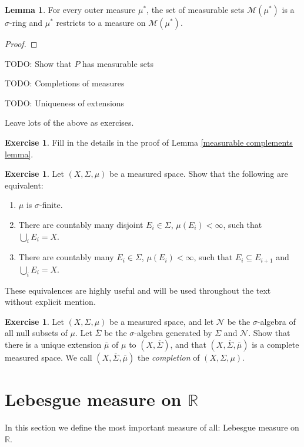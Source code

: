 \documentclass[12pt]{book}
\newcommand{\RR}{\mathbb{R}}
\newcommand{\dfn}[1]{\emph{#1}\index{#1}}
\theoremstyle{definition}
\newtheorem{lemma}[theorem]{Lemma}
\newtheorem{exercise}[theorem]{Exercise}
\begin{document}
\begin{lemma}
For every outer measure $\mu^*$, the set of measurable sets $\mathcal M(\mu^*)$ is a $\sigma$-ring and $\mu^*$ restricts to a measure on $\mathcal M(\mu^*)$.
\end{lemma}
\begin{proof}

\end{proof}



TODO: Show that $P$ has measurable sets

TODO: Completions of measures

TODO: Uniqueness of extensions

Leave lots of the above as exercises.

\begin{exercise}
\label{measurable complements}
Fill in the details in the proof of Lemma \ref{measurable complements lemma}.
\end{exercise}

\begin{exercise}
Let $(X, \Sigma, \mu)$ be a measured space. Show that the following are equivalent:
\begin{enumerate}
\item $\mu$ is $\sigma$-finite.
\item There are countably many disjoint $E_i \in \Sigma$, $\mu(E_i) < \infty$, such that $\bigcup_i E_i = X$.
\item There are countably many $E_i \in \Sigma$, $\mu(E_i) < \infty$, such that $E_i \subseteq E_{i+1}$ and $\bigcup_i E_i = X$.
\end{enumerate}
These equivalences are highly useful and will be used throughout the text without explicit mention.
\end{exercise}

\begin{exercise}
Let $(X, \Sigma, \mu)$ be a measured space, and let $\mathcal N$ be the $\sigma$-algebra of all null subsets of $\mu$. Let $\overline \Sigma$ be the $\sigma$-algebra generated by $\Sigma$ and $\mathcal N$.
Show that there is a unique extension $\overline \mu$ of $\mu$ to $(X, \overline \Sigma)$, and that $(X, \overline \Sigma, \overline \mu)$ is a complete measured space.
We call $(X, \overline \Sigma, \overline \mu)$ the \dfn{completion} of $(X, \Sigma, \mu)$.
\end{exercise}

\section{Lebesgue measure on $\RR$}
In this section we define the most important measure of all: Lebesgue measure on $\RR$.
\end{document}
